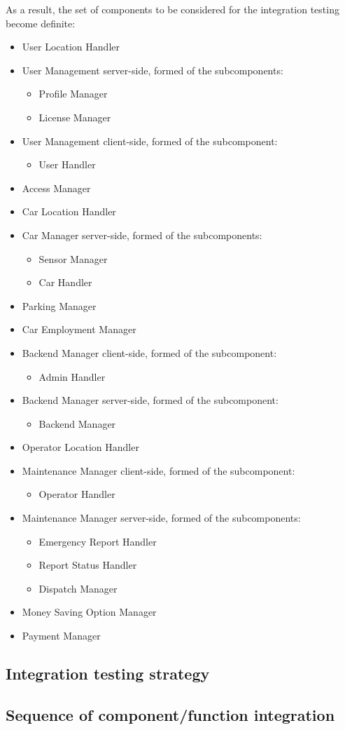 	As a result, the set of components to be considered for the integration testing become definite:
	\begin{itemize}
		\item User Location Handler
		\item User Management server-side, formed of the subcomponents:
			\begin{itemize}
				\item Profile Manager
				\item License Manager
			\end{itemize}
		\item User Management client-side, formed of the subcomponent:
			\begin{itemize}
				\item User Handler
			\end{itemize}
		\item Access Manager
		\item Car Location Handler
		\item Car Manager server-side, formed of the subcomponents:
			\begin{itemize}
				\item Sensor Manager
				\item Car Handler
			\end{itemize}
		\item Parking Manager
		\item Car Employment Manager
		\item Backend Manager client-side, formed of the subcomponent:
			\begin{itemize}
				\item Admin Handler
			\end{itemize}
		\item Backend Manager server-side, formed of the subcomponent:
			\begin{itemize}
				\item Backend Manager
			\end{itemize}
		\item Operator Location Handler
		\item Maintenance Manager client-side, formed of the subcomponent:
			\begin{itemize}
				\item Operator Handler
			\end{itemize}
		\item Maintenance Manager server-side, formed of the subcomponents:
			\begin{itemize}
				\item Emergency Report Handler
				\item Report Status Handler
				\item Dispatch Manager
			\end{itemize}
		\item Money Saving Option Manager
		\item Payment Manager
	\end{itemize}
	

\subsection{Integration testing strategy}

\subsection{Sequence of component/function integration}
